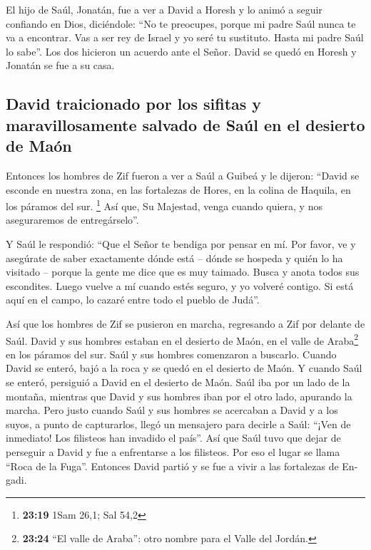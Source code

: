  El hijo de Saúl, Jonatán, fue a ver a David a Horesh y
lo animó a seguir confiando en Dios, diciéndole:  ``No te
preocupes, porque mi padre Saúl nunca te va a encontrar. Vas a ser rey
de Israel y yo seré tu sustituto. Hasta mi padre Saúl lo sabe''.
 Los dos hicieron un acuerdo ante el Señor. David se
quedó en Horesh y Jonatán se fue a su casa.

\hypertarget{david-traicionado-por-los-sifitas-y-maravillosamente-salvado-de-sauxfal-en-el-desierto-de-mauxf3n}{%
\subsection{David traicionado por los sifitas y maravillosamente salvado
de Saúl en el desierto de
Maón}\label{david-traicionado-por-los-sifitas-y-maravillosamente-salvado-de-sauxfal-en-el-desierto-de-mauxf3n}}

 Entonces los hombres de Zif fueron a ver a Saúl a Guibeá
y le dijeron: ``David se esconde en nuestra zona, en las fortalezas de
Hores, en la colina de Haquila, en los páramos del sur. \footnote{\textbf{23:19}
  1Sam 26,1; Sal 54,2}  Así que, Su Majestad, venga
cuando quiera, y nos aseguraremos de entregárselo''.

 Y Saúl le respondió: ``Que el Señor te bendiga por
pensar en mí.  Por favor, ve y asegúrate de saber
exactamente dónde está -- dónde se hospeda y quién lo ha visitado --
porque la gente me dice que es muy taimado.  Busca y
anota todos sus escondites. Luego vuelve a mí cuando estés seguro, y yo
volveré contigo. Si está aquí en el campo, lo cazaré entre todo el
pueblo de Judá''.

 Así que los hombres de Zif se pusieron en marcha,
regresando a Zif por delante de Saúl. David y sus hombres estaban en el
desierto de Maón, en el valle de Araba\footnote{\textbf{23:24} ``El
  valle de Araba'': otro nombre para el Valle del Jordán.} en los
páramos del sur.  Saúl y sus hombres comenzaron a
buscarlo. Cuando David se enteró, bajó a la roca y se quedó en el
desierto de Maón. Y cuando Saúl se enteró, persiguió a David en el
desierto de Maón.  Saúl iba por un lado de la montaña,
mientras que David y sus hombres iban por el otro lado, apurando la
marcha. Pero justo cuando Saúl y sus hombres se acercaban a David y a
los suyos, a punto de capturarlos,  llegó un mensajero
para decirle a Saúl: ``¡Ven de inmediato! Los filisteos han invadido el
país''.  Así que Saúl tuvo que dejar de perseguir a David
y fue a enfrentarse a los filisteos. Por eso el lugar se llama ``Roca de
la Fuga''.  Entonces David partió y se fue a vivir a las
fortalezas de En-gadi.

